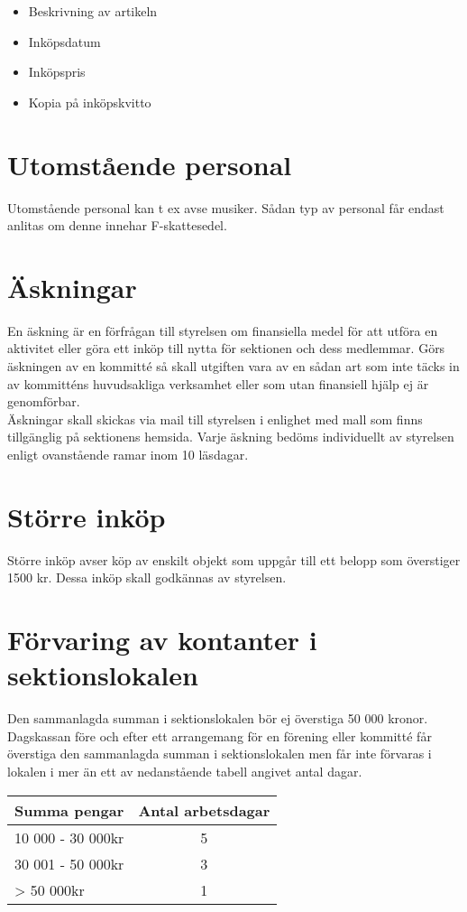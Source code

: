 \documentclass[11pt, includeaddress]{classes/cthit}
\begin{document}
\begin{itemize}
	\item Beskrivning av artikeln
	\item Inköpsdatum
	\item Inköpspris
	\item Kopia på inköpskvitto
\end{itemize}


\section{Utomstående personal}
Utomstående personal kan t ex avse musiker. Sådan typ av personal får endast anlitas om denne innehar F-skattesedel.

\section{Äskningar}
En äskning är en förfrågan till styrelsen om finansiella medel för att utföra en aktivitet eller göra ett inköp till nytta för sektionen och dess medlemmar. Görs äskningen av en kommitté så skall utgiften vara av en sådan art som inte täcks in av kommitténs huvudsakliga verksamhet eller som utan finansiell hjälp ej är genomförbar. \\

Äskningar skall skickas via mail till styrelsen i enlighet med mall som finns tillgänglig på sektionens hemsida. Varje äskning bedöms individuellt av styrelsen enligt ovanstående ramar inom 10 läsdagar.

\section{Större inköp}
Större inköp avser köp av enskilt objekt som uppgår till ett belopp som överstiger 1500 kr. Dessa inköp skall godkännas av styrelsen.

\section{Förvaring av kontanter i sektionslokalen}
Den sammanlagda summan i sektionslokalen bör ej överstiga 50 000 kronor. \\
Dagskassan före och efter ett arrangemang för en förening eller kommitté får överstiga den sammanlagda summan i sektionslokalen men får inte förvaras i lokalen i mer än ett av nedanstående tabell angivet antal dagar.

\begin{table}[h]
\centering
\begin{tabular}{  l  c }
	{\large{\textbf{Summa pengar}}} & {\large{\textbf{Antal arbetsdagar}}} \\
	\hline
	{10 000 - 30 000kr} & {5} \\
	{30 001 - 50 000kr} & {3} \\
	{> 50 000kr} & {1} \\
\end{tabular}
\end{table}
\end{document}

